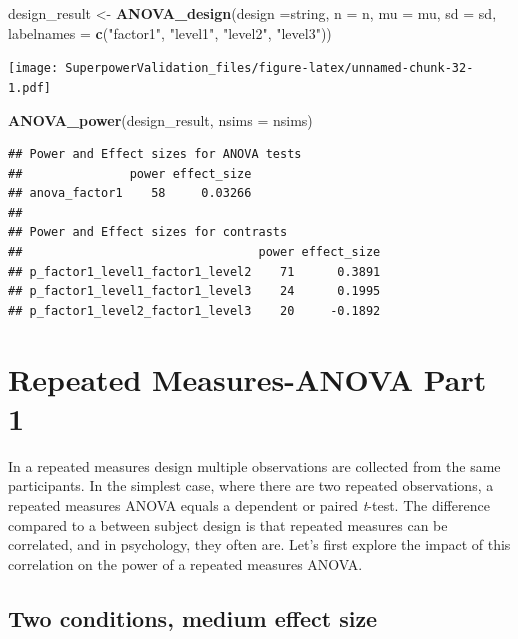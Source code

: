 \documentclass[]{book}
\newenvironment{Shaded}{\begin{snugshade}}{\end{snugshade}}
\newcommand{\DataTypeTok}[1]{\textcolor[rgb]{0.13,0.29,0.53}{#1}}
\newcommand{\KeywordTok}[1]{\textcolor[rgb]{0.13,0.29,0.53}{\textbf{#1}}}
\newcommand{\NormalTok}[1]{#1}
\newcommand{\StringTok}[1]{\textcolor[rgb]{0.31,0.60,0.02}{#1}}
\begin{document}
\begin{Shaded}
\begin{Highlighting}[]
\NormalTok{design_result <-}\StringTok{ }\KeywordTok{ANOVA_design}\NormalTok{(}\DataTypeTok{design =}\NormalTok{string,}
                   \DataTypeTok{n =}\NormalTok{ n, }
                   \DataTypeTok{mu =}\NormalTok{ mu, }
                   \DataTypeTok{sd =}\NormalTok{ sd, }
                   \DataTypeTok{labelnames =} \KeywordTok{c}\NormalTok{(}\StringTok{"factor1"}\NormalTok{, }\StringTok{"level1"}\NormalTok{, }\StringTok{"level2"}\NormalTok{, }\StringTok{"level3"}\NormalTok{))}
\end{Highlighting}
\end{Shaded}

\texttt{[image: SuperpowerValidation\_files/figure-latex/unnamed-chunk-32-1.pdf]}

\begin{Shaded}
\begin{Highlighting}[]
\KeywordTok{ANOVA_power}\NormalTok{(design_result, }\DataTypeTok{nsims =}\NormalTok{ nsims)}
\end{Highlighting}
\end{Shaded}

\begin{verbatim}
## Power and Effect sizes for ANOVA tests
##               power effect_size
## anova_factor1    58     0.03266
## 
## Power and Effect sizes for contrasts
##                                 power effect_size
## p_factor1_level1_factor1_level2    71      0.3891
## p_factor1_level1_factor1_level3    24      0.1995
## p_factor1_level2_factor1_level3    20     -0.1892
\end{verbatim}

\hypertarget{repeated-measures-anova-part-1}{%
\chapter{Repeated Measures-ANOVA Part 1}\label{repeated-measures-anova-part-1}}

In a repeated measures design multiple observations are collected from the same participants. In the simplest case, where there are two repeated observations, a repeated measures ANOVA equals a dependent or paired \emph{t}-test. The difference compared to a between subject design is that repeated measures can be correlated, and in psychology, they often are. Let's first explore the impact of this correlation on the power of a repeated measures ANOVA.

\hypertarget{two-conditions-medium-effect-size}{%
\section{Two conditions, medium effect size}\label{two-conditions-medium-effect-size}}
\end{document}
